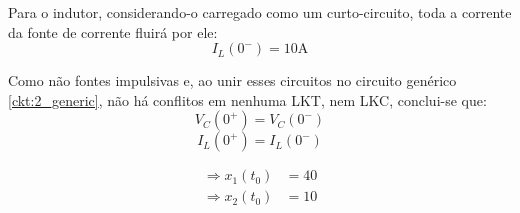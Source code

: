 \documentclass{report}
\begin{document}
Para o indutor, considerando-o carregado como um curto-circuito, toda a corrente da fonte de corrente fluirá por ele:
$$ I_L(0^-) = 10\text{A} $$

Como não fontes impulsivas e, ao unir esses circuitos no circuito genérico \ref{ckt:2_generic}, não há conflitos em nenhuma LKT,
nem LKC, conclui-se que:
$$ V_C(0^+) = V_C(0^-) $$
$$ I_L(0^+) = I_L(0^-) $$

\vspace*{-1.5\baselineskip}
\begin{center}
    \begin{align}
        \label{eq:8.38.1_x1_0}
        \Rightarrow x_1(t_0) &= 40 \\
        \label{eq:8.38.1_x2_0}
        \Rightarrow x_2(t_0) &= 10
    \end{align}
\end{center}
\end{document}
